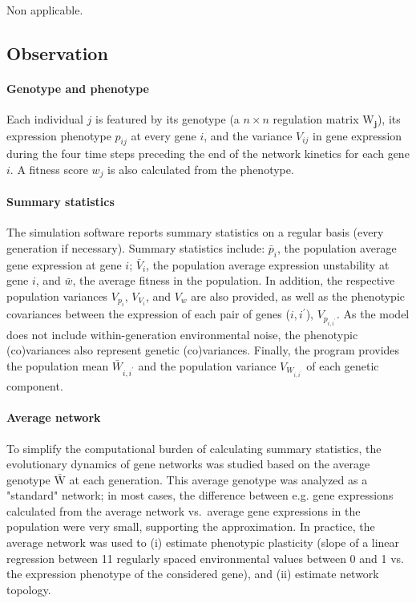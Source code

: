 \documentclass{article}
\begin{document}
Non applicable.

\subsection{Observation}

\paragraph{Genotype and phenotype} Each individual $j$ is featured by its genotype (a $n \times n$ regulation matrix $\bm{\mathrm W_j}$), its expression phenotype $p_{ij}$ at every gene $i$, and the variance $V_{ij}$ in gene expression during the four time steps preceding the end of the network kinetics for each gene $i$. A fitness score $w_j$ is also calculated from the phenotype. 

\paragraph{Summary statistics} The simulation software reports summary statistics on a regular basis (every generation if necessary). Summary statistics include: $\bar p_i$, the population average gene expression at gene $i$; $\bar V_i$, the population average expression unstability at gene $i$, and $\bar w$, the average fitness in the population. In addition, the respective population variances $V_{p_i}$, $V_{V_i}$, and $V_w$ are also provided, as well as the phenotypic covariances between the expression of each pair of genes ($i, i^\prime$), $V_{p_{i,i^\prime}}$. As the model does not include within-generation environmental noise, the phenotypic (co)variances also represent genetic (co)variances. Finally, the program provides the population mean $\bar W_{i,i^\prime}$ and the population variance $V_{W_{i,i^\prime}}$ of each genetic component. 

\paragraph{Average network} To simplify the computational burden of calculating summary statistics, the evolutionary dynamics of gene networks was studied based on the average genotype $\bar{\bm{\mathrm W}}$ at each generation. This average genotype was analyzed as a "standard" network; in most cases, the difference between e.g. gene expressions calculated from the average network vs.\ average gene expressions in the population were very small, supporting the approximation. In practice, the average network was used to (i) estimate phenotypic plasticity (slope of a linear regression between 11 regularly spaced environmental values between 0 and 1 vs. the expression phenotype of the considered gene), and (ii) estimate network topology. 
\end{document}
